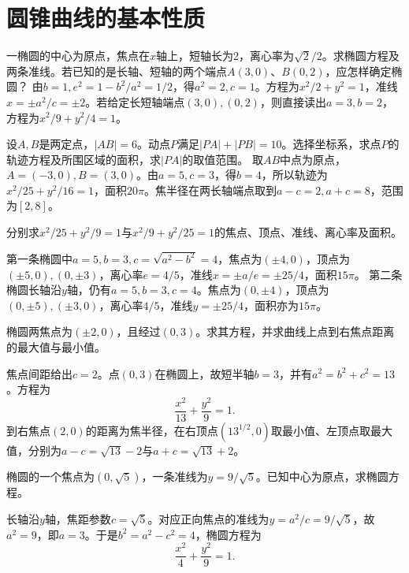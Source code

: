 \par\addvspace{12pt}

\section{圆锥曲线的基本性质}

一椭圆的中心为原点，焦点在\(x\)轴上，短轴长为\(2\)，离心率为\(\sqrt2/2\)。求椭圆方程及两条准线。若已知的是长轴、短轴的两个端点\(A(3,0)\)、\(B(0,2)\)，应怎样确定椭圆？
\solutionanswer
由\(b=1,e^2=1-b^2/a^2=1/2\)，得\(a^2=2,c=1\)。方程为\(x^2/2+y^2=1\)，准线\(x=\pm a^2/c=\pm2\)。若给定长短轴端点\((3,0),(0,2)\)，则直接读出\(a=3,b=2\)，方程为\(x^2/9+y^2/4=1\)。


设\(A,B\)是两定点，\(|AB|=6\)。动点\(P\)满足\(|PA|+|PB|=10\)。选择坐标系，求点\(P\)的轨迹方程及所围区域的面积，求\(|PA|\)的取值范围。
\solutionanswer
取\(AB\)中点为原点，\(A=(-3,0),B=(3,0)\)。由\(a=5,c=3\)，得\(b=4\)，所以轨迹为\(x^2/25+y^2/16=1\)，面积\(20\pi\)。焦半径在两长轴端点取到\(a-c=2,a+c=8\)，范围为\([2,8]\)。


分别求\(x^2/25+y^2/9=1\)与\(x^2/9+y^2/25=1\)的焦点、顶点、准线、离心率及面积。
\par
\solutionanswer
第一条椭圆中\(a=5,b=3,c=\sqrt{a^2-b^2}=4\)，焦点为\((\pm4,0)\)，顶点为\((\pm5,0),(0,\pm3)\)，离心率\(e=4/5\)，准线\(x=\pm a/e=\pm25/4\)，面积\(15\pi\)。
第二条椭圆长轴沿\(y\)轴，仍有\(a=5,b=3,c=4\)。焦点为\((0,\pm4)\)，顶点为\((0,\pm5),(\pm3,0)\)，离心率\(4/5\)，准线\(y=\pm25/4\)，面积亦为\(15\pi\)。


椭圆两焦点为\((\pm2,0)\)，且经过\((0,3)\)。求其方程，并求曲线上点到右焦点距离的最大值与最小值。
\par
\solutionanswer
焦点间距给出\(c=2\)。点\((0,3)\)在椭圆上，故短半轴\(b=3\)，并有\(a^2=b^2+c^2=13\)。方程为
\[\frac{x^2}{13}+\frac{y^2}{9}=1.\]
到右焦点\((2,0)\)的距离为焦半径，在右顶点\((13^{1/2},0)\)取最小值、左顶点取最大值，分别为\(a-c=\sqrt{13}-2\)与\(a+c=\sqrt{13}+2\)。


椭圆的一个焦点为\((0,\sqrt5)\)，一条准线为\(y=9/\sqrt5\)。已知中心为原点，求椭圆方程。
\par
\solutionanswer
长轴沿\(y\)轴，焦距参数\(c=\sqrt5\)。对应正向焦点的准线为\(y=a^2/c=9/\sqrt5\)，故\(a^2=9\)，即\(a=3\)。于是\(b^2=a^2-c^2=4\)，椭圆方程为
\[\frac{x^2}{4}+\frac{y^2}{9}=1.\]



